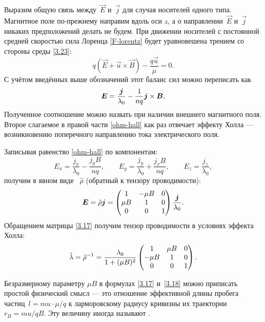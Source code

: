 Выразим общую связь между~$\vec{E}$ и~$\vec{j}$ для случая носителей одного типа.
Магнитное поле по-прежнему направим вдоль оси $z$, а о 
направлении~$\vec{E}$ и~$\vec{j}$ никаких предположений делать не будем.
При движении носителей с постоянной средней скоростью сила Лоренца
\eqref{F-lorentz} будет уравновешена трением со стороны среды \eqref{3.23}:
\begin{equation*}
    q(\vec{E}+\vec{u}\times \vec{B}) - \frac{q\vec{u}}{\mu} =0.
\end{equation*}
С учётом введённых выше обозначений этот баланс сил можно переписать как
\begin{equation}
    \eqmark{ohm-hall}
    \vec{E} = \frac{\vec{j}}{\lambda_0} -
    \frac{1}{nq} \vec{j}\times\vec{B},
\end{equation}
Полученное соотношение можно назвать  при
наличии внешнего магнитного поля. Второе слагаемое в правой части \eqref{ohm-hall}
как раз отвечает эффекту Холла --- возникновению поперечного 
направлению тока электрического поля.

Записывая равенство \eqref{ohm-hall} по компонентам:
\[
E_x = \frac{j_x}{\lambda_0}  -  \frac{j_y B}{nq} ,\qquad
    E_y = \frac{j_y}{\lambda_0} +  \frac{j_xB}{nq} ,\qquad
    E_z = \frac{j_z}{\lambda_0},
\]
получим в явном виде
~$\hat{\rho}$ (обратный к тензору
проводимости):
\begin{equation}
    \vec{E}=\hat{\rho}\vec{j}= \left(
    \begin{matrix}
        1 & -\mu B & {0} \\
        \mu B & 1 & {0} \\
        {0} &{0}& 1
    \end{matrix}
    \right)
    \frac{\vec{j}}{\lambda_0}.
    \eqmark{3.17}
\end{equation}
Обращением матрицы \eqref{3.17} получим тензор проводимости
в условиях эффекта Холла:
\begin{equation}
    \hat{\lambda} = \hat{\rho}^{-1}=
    \frac{\lambda_0}{1+(\mu B)^2}\left(
    \begin{matrix}
        {1} & \mu B & {0} \\
        -\mu B & 1 & {0} \\
        {0} &{0}& 1 \\
    \end{matrix}
    \right).
    \eqmark{3.18}
\end{equation}

Безразмерному параметру $\mu B$ в формулах 
\eqref{3.17} и~\eqref{3.18} можно приписать простой
физический смысл --- это отношение эффективной длины пробега 
частиц~$l=mu\cdot \mu/q$ к ларморовскому радиусу кривизны их траектории $r_B=mu/qB$.
Эту величину иногда называют . 

